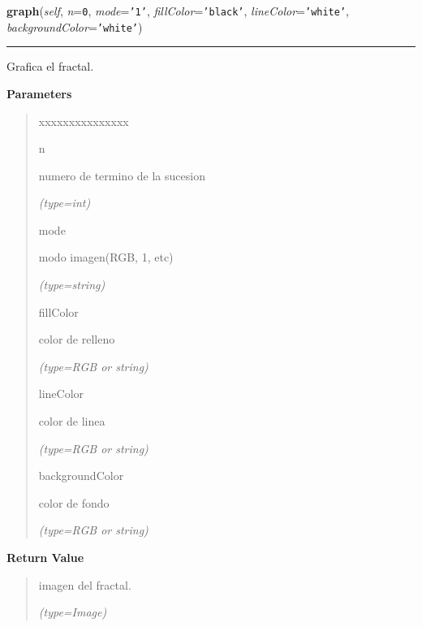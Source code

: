 \hspace{.8\funcindent}\begin{boxedminipage}{\funcwidth}

    \raggedright \textbf{graph}(\textit{self}, \textit{n}={\tt 0}, \textit{mode}={\tt \texttt{'}\texttt{1}\texttt{'}}, \textit{fillColor}={\tt \texttt{'}\texttt{black}\texttt{'}}, \textit{lineColor}={\tt \texttt{'}\texttt{white}\texttt{'}}, \textit{backgroundColor}={\tt \texttt{'}\texttt{white}\texttt{'}})

    \vspace{-1.5ex}

    \rule{\textwidth}{0.5\fboxrule}
\setlength{\parskip}{2ex}
    Grafica el fractal.

\setlength{\parskip}{1ex}
      \textbf{Parameters}
      \vspace{-1ex}

      \begin{quote}
        \begin{Ventry}{xxxxxxxxxxxxxxx}

          \item[n]

          numero de termino de la sucesion

            {\it (type=int)}

          \item[mode]

          modo imagen(RGB, 1, etc)

            {\it (type=string)}

          \item[fillColor]

          color de relleno

            {\it (type=RGB or string)}

          \item[lineColor]

          color de linea

            {\it (type=RGB or string)}

          \item[backgroundColor]

          color de fondo

            {\it (type=RGB or string)}

        \end{Ventry}

      \end{quote}

      \textbf{Return Value}
    \vspace{-1ex}

      \begin{quote}
      imagen del fractal.

      {\it (type=Image)}

      \end{quote}

    \end{boxedminipage}

